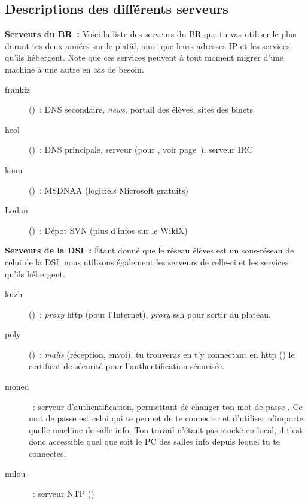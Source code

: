 \subsection{Descriptions des différents serveurs}
{\bf Serveurs du BR~:} Voici la liste des serveurs du BR que tu vas
utiliser le plus durant tes deux années sur le platâl, ainsi que
leurs adresses IP et les services qu'ils hébergent. Note que ces services
peuvent à tout moment migrer d'une machine à une autre en cas de
besoin.


\begin{description}
        \item[frankiz] ()~: DNS secondaire,
        \emph{news}, portail des élèves, sites des binets
        \item[heol] ()~: DNS principale,
        serveur  (pour , voir page~\pageref{qrezix}), serveur IRC
    \item[koun] ()~: MSDNAA (logiciels Microsoft gratuits)
    \item[Lodan] ()~: D\'epot SVN (plus d'infos sur le WikiX)
\end {description}

{\bf Serveurs de la DSI~: } \'Etant donné que le réseau élèves est un
sous-réseau de celui de la DSI, nous utilisons également les
serveurs de celle-ci et les services qu'ils hébergent.

\begin{description}
        \item[kuzh] ()~: \emph{proxy} http (pour l'Internet), \emph{proxy} ssh pour sortir du plateau.
        \item[poly] ()~: \emph{mails} (réception, envoi), tu trouveras en t'y connectant en http () le certificat de sécurité pour l'authentification sécurisée.
        \item[moned]~: serveur d'authentification, permettant de
        changer ton mot de passe . Ce mot de passe est celui qui
        te permet de te connecter et d'utiliser n'importe
        quelle machine de salle info. Ton travail n'étant pas stocké
        en local, il t'est donc accessible quel que soit le PC des salles info depuis
        lequel tu te connectes.
    \item[milou]~: serveur NTP ()
\end {description}


